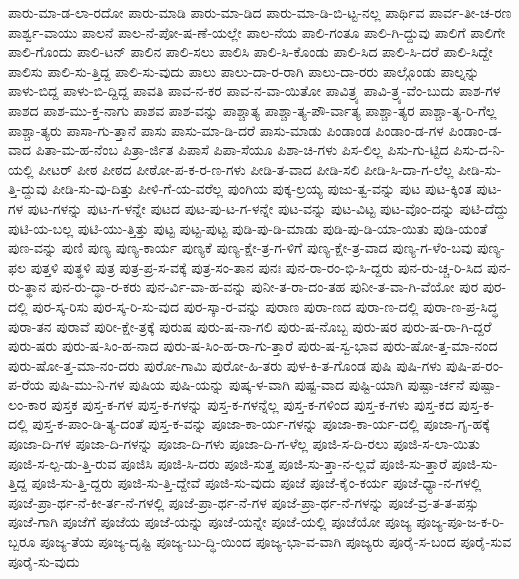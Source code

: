 {ಪಾರು-ಮಾ-ಡ-ಲಾ-ರದೋ
ಪಾರು-ಮಾಡಿ
ಪಾರು-ಮಾ-ಡಿದ
ಪಾರು-ಮಾ-ಡಿ-ಬಿ-ಟ್ಟ-ನಲ್ಲ
ಪಾರ್ಥಿವ
ಪಾರ್ವ-ತೀ-ಚ-ರಣ
ಪಾರ್ಶ್ವ-ವಾಯು
ಪಾಲನೆ
ಪಾಲ-ನೆ-ಪೋ-ಷ-ಣೆ-ಯಲ್ಲೇ
ಪಾಲ-ನೆಯ
ಪಾಲಿ-ಗಂತೂ
ಪಾಲಿ-ಗಿ-ದ್ದುವು
ಪಾಲಿಗೆ
ಪಾಲಿಗೇ
ಪಾಲಿ-ಗೊಂದು
ಪಾಲಿ-ಟನ್
ಪಾಲಿನ
ಪಾಲಿ-ಸಲು
ಪಾಲಿಸಿ
ಪಾಲಿ-ಸಿ-ಕೊಂಡು
ಪಾಲಿ-ಸಿದ
ಪಾಲಿ-ಸಿ-ದರೆ
ಪಾಲಿ-ಸಿದ್ದೇ
ಪಾಲಿಸು
ಪಾಲಿ-ಸು-ತ್ತಿದ್ದ
ಪಾಲಿ-ಸು-ವುದು
ಪಾಲು
ಪಾಲು-ದಾ-ರ-ರಾಗಿ
ಪಾಲು-ದಾ-ರರು
ಪಾಲ್ಗೊಂಡು
ಪಾಲ್ನನ್ನು
ಪಾಳು-ಬಿದ್ದ
ಪಾಳು-ಬಿ-ದ್ದಿದ್ದ
ಪಾವತಿ
ಪಾವ-ನ-ಕರ
ಪಾವ-ನ-ವಾ-ಯಿತೋ
ಪಾವಿತ್ರ್ಯ
ಪಾವಿ-ತ್ರ್ಯ-ವೆಂ-ಬುದು
ಪಾಶ-ಗಳ
ಪಾಶದ
ಪಾಶ-ಮು-ಕ್ತ-ನಾಗು
ಪಾಶವ
ಪಾಶ-ವನ್ನು
ಪಾಶ್ಚಾತ್ಯ
ಪಾಶ್ಚಾ-ತ್ಯ-ಪೌ-ರ್ವಾತ್ಯ
ಪಾಶ್ಚಾ-ತ್ಯರ
ಪಾಶ್ಚಾ-ತ್ಯ-ರಿ-ಗೆಲ್ಲ
ಪಾಶ್ಚಾ-ತ್ಯರು
ಪಾಸಾ-ಗು-ತ್ತಾನೆ
ಪಾಸು
ಪಾಸು-ಮಾ-ಡಿ-ದರೆ
ಪಾಸು-ಮಾಡು
ಪಿಂಡಾಂಡ
ಪಿಂಡಾಂ-ಡ-ಗಳ
ಪಿಂಡಾಂ-ಡ-ವಾದ
ಪಿತಾ-ಮ-ಹ-ನೆಂಬ
ಪಿತ್ರಾ-ರ್ಜಿತ
ಪಿಪಾಸೆ
ಪಿಪಾ-ಸೆಯೂ
ಪಿಶಾ-ಚಿ-ಗಳು
ಪಿಸ-ಲಿಲ್ಲ
ಪಿಸು-ಗು-ಟ್ಟಿದ
ಪಿಸು-ದ-ನಿ-ಯಲ್ಲಿ
ಪೀಟರ್
ಪೀಠ
ಪೀಠದ
ಪೀಠೋ-ಪ-ಕ-ರ-ಣ-ಗಳು
ಪೀಡಿ-ತ-ವಾದ
ಪೀಡಿ-ಸಲಿ
ಪೀಡಿ-ಸಿ-ದಾ-ಗ-ಲೆಲ್ಲ
ಪೀಡಿ-ಸು-ತ್ತಿ-ದ್ದುವು
ಪೀಡಿ-ಸು-ವು-ದಿತ್ತು
ಪೀಳಿ-ಗೆ-ಯ-ವರೆಲ್ಲ
ಪುಂಗಿಯ
ಪುಕ್ಕ-ಲ್ರಯ್ಯ
ಪುಜು-ತ್ವ-ವನ್ನು
ಪುಟ
ಪುಟ-ಕ್ಕಿಂತ
ಪುಟ-ಗಳ
ಪುಟ-ಗಳನ್ನು
ಪುಟ-ಗ-ಳನ್ನೇ
ಪುಟದ
ಪುಟ-ಪು-ಟ-ಗ-ಳನ್ನೇ
ಪುಟ-ವನ್ನು
ಪುಟ-ವಿಟ್ಟ
ಪುಟ-ವೊಂ-ದನ್ನು
ಪುಟಿ-ದೆದ್ದು
ಪುಟಿ-ಯ-ಬಲ್ಲ
ಪುಟಿ-ಯು-ತ್ತಿತ್ತು
ಪುಟ್ಟ
ಪುಟ್ಟ-ಪುಟ್ಟ
ಪುಡಿ-ಪು-ಡಿ-ಮಾಡು
ಪುಡಿ-ಪು-ಡಿ-ಯಾ-ಯಿತು
ಪುಡಿ-ಯಂತೆ
ಪುಣ-ವನ್ನು
ಪುಣಿ
ಪುಣ್ಯ
ಪುಣ್ಯ-ಕಾರ್ಯ
ಪುಣ್ಯಕೆ
ಪುಣ್ಯ-ಕ್ಷೇ-ತ್ರ-ಗ-ಳಿಗೆ
ಪುಣ್ಯ-ಕ್ಷೇ-ತ್ರ-ವಾದ
ಪುಣ್ಯ-ಗ-ಳೆಂ-ಬವು
ಪುಣ್ಯ-ಫಲ
ಪುತ್ತಳಿ
ಪುತ್ಥಳಿ
ಪುತ್ರ
ಪುತ್ರ-ಪ್ರ-ಸ-ವಕ್ಕೆ
ಪುತ್ರ-ಸಂ-ತಾನ
ಪುನಃ
ಪುನ-ರಾ-ರಂ-ಭಿ-ಸಿ-ದ್ದರು
ಪುನ-ರು-ಚ್ಚ-ರಿ-ಸಿದ
ಪುನ-ರು-ತ್ಥಾನ
ಪುನ-ರು-ದ್ಧಾ-ರ-ಕರು
ಪುನ-ರ್ವಿ-ವಾ-ಹ-ವನ್ನು
ಪುನೀ-ತ-ರಾ-ದಂ-ತಹ
ಪುನೀ-ತ-ವಾ-ಗಿ-ವೆಯೋ
ಪುರ
ಪುರ-ದಲ್ಲಿ
ಪುರ-ಸ್ಕ-ರಿಸು
ಪುರ-ಸ್ಕ-ರಿ-ಸು-ವುದ
ಪುರ-ಸ್ಕಾ-ರ-ವನ್ನು
ಪುರಾಣ
ಪುರಾ-ಣದ
ಪುರಾ-ಣ-ದಲ್ಲಿ
ಪುರಾ-ಣ-ಪ್ರ-ಸಿದ್ಧ
ಪುರಾ-ತನ
ಪುರಾವೆ
ಪುರೀ-ಕ್ಷೇ-ತ್ರಕ್ಕೆ
ಪುರುಷ
ಪುರು-ಷ-ನಾ-ಗಲಿ
ಪುರು-ಷ-ನೊಬ್ಬ
ಪುರು-ಷರ
ಪುರು-ಷ-ರಾ-ಗಿ-ದ್ದರೆ
ಪುರು-ಷರು
ಪುರು-ಷ-ಸಿಂ-ಹ-ನಾದ
ಪುರು-ಷ-ಸಿಂ-ಹ-ರಾ-ಗು-ತ್ತಾರೆ
ಪುರು-ಷ-ಸ್ವ-ಭಾವ
ಪುರು-ಷೋ-ತ್ತ-ಮಾ-ನಂದ
ಪುರು-ಷೋ-ತ್ತ-ಮಾ-ನಂ-ದರು
ಪುರೋ-ಗಾಮಿ
ಪುರೋ-ಹಿ-ತರು
ಪುಳ-ಕಿ-ತ-ಗೊಂಡ
ಪುಷಿ
ಪುಷಿ-ಗಳು
ಪುಷಿ-ಪ-ರಂ-ಪ-ರೆಯ
ಪುಷಿ-ಮು-ನಿ-ಗಳ
ಪುಷಿಯ
ಪುಷಿ-ಯನ್ನು
ಪುಷ್ಕ-ಳ-ವಾಗಿ
ಪುಷ್ಟ-ವಾದ
ಪುಷ್ಟಿ-ಯಾಗಿ
ಪುಷ್ಪಾ-ರ್ಚನೆ
ಪುಷ್ಪಾ-ಲಂ-ಕಾರ
ಪುಸ್ತಕ
ಪುಸ್ತ-ಕ-ಗಳ
ಪುಸ್ತ-ಕ-ಗಳನ್ನು
ಪುಸ್ತ-ಕ-ಗಳನ್ನೆಲ್ಲ
ಪುಸ್ತ-ಕ-ಗಳಿಂದ
ಪುಸ್ತ-ಕ-ಗಳು
ಪುಸ್ತ-ಕದ
ಪುಸ್ತ-ಕ-ದಲ್ಲಿ
ಪುಸ್ತ-ಕ-ಪಾಂ-ಡಿ-ತ್ಯ-ದಂತೆ
ಪುಸ್ತ-ಕ-ವನ್ನು
ಪೂಜಾ-ಕಾ-ರ್ಯ-ಗಳನ್ನು
ಪೂಜಾ-ಕಾ-ರ್ಯ-ದಲ್ಲಿ
ಪೂಜಾ-ಗೃ-ಹಕ್ಕೆ
ಪೂಜಾ-ದಿ-ಗಳ
ಪೂಜಾ-ದಿ-ಗಳನ್ನು
ಪೂಜಾ-ದಿ-ಗಳು
ಪೂಜಾ-ದಿ-ಗ-ಳೆಲ್ಲ
ಪೂಜಿ-ಸ-ದಿ-ರಲು
ಪೂಜಿ-ಸ-ಲಾ-ಯಿತು
ಪೂಜಿ-ಸ-ಲ್ಪ-ಡು-ತ್ತಿ-ರುವ
ಪೂಜಿಸಿ
ಪೂಜಿ-ಸಿ-ದರು
ಪೂಜಿ-ಸುತ್ತ
ಪೂಜಿ-ಸು-ತ್ತಾ-ನ-ಲ್ಲವೆ
ಪೂಜಿ-ಸು-ತ್ತಾರೆ
ಪೂಜಿ-ಸು-ತ್ತಿದ್ದ
ಪೂಜಿ-ಸು-ತ್ತಿ-ದ್ದರು
ಪೂಜಿ-ಸು-ತ್ತಿ-ದ್ದೇವೆ
ಪೂಜಿ-ಸು-ವುದು
ಪೂಜೆ
ಪೂಜೆ-ಕೈಂ-ಕರ್ಯ
ಪೂಜೆ-ಧ್ಯಾ-ನ-ಗಳಲ್ಲಿ
ಪೂಜೆ-ಪ್ರಾ-ರ್ಥ-ನೆ-ಕೀ-ರ್ತ-ನೆ-ಗಳಲ್ಲಿ
ಪೂಜೆ-ಪ್ರಾ-ರ್ಥ-ನೆ-ಗಳ
ಪೂಜೆ-ಪ್ರಾ-ರ್ಥ-ನೆ-ಗಳನ್ನು
ಪೂಜೆ-ವ್ರ-ತ-ತ-ಪಸ್ಸು
ಪೂಜೆ-ಗಾಗಿ
ಪೂಜೆಗೆ
ಪೂಜೆಯ
ಪೂಜೆ-ಯನ್ನು
ಪೂಜೆ-ಯನ್ನೇ
ಪೂಜೆ-ಯಲ್ಲಿ
ಪೂಜೆಯೋ
ಪೂಜ್ಯ
ಪೂಜ್ಯ-ಪೂ-ಜ-ಕ-ರಿ-ಬ್ಬರೂ
ಪೂಜ್ಯ-ತೆಯ
ಪೂಜ್ಯ-ದೃಷ್ಟಿ
ಪೂಜ್ಯ-ಬು-ದ್ಧಿ-ಯಿಂದ
ಪೂಜ್ಯ-ಭಾ-ವ-ವಾಗಿ
ಪೂಜ್ಯರು
ಪೂರೈ-ಸ-ಬಂದ
ಪೂರೈ-ಸುವ
ಪೂರೈ-ಸು-ವುದು
}
